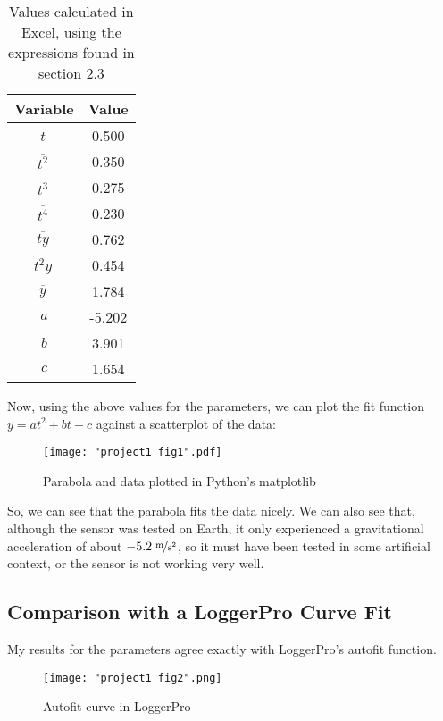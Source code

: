 \documentclass{article}
\newcommand{\ol}[1]{\overline{#1}\,} %
\begin{document}
\begin{table}[H]
	\centering
	\begin{tabular}{cc}
		\toprule
		\textbf{Variable} & \textbf{Value} \\
		\midrule
		$\ol{t}$ & 0.500\\
		$\ol{t^2}$ & 0.350\\
		$\ol{t^3}$ & 0.275\\
		$\ol{t^4}$ & 0.230\\
		$\ol{ty}$ & 0.762\\
		$\ol{t^2y}$ & 0.454\\
		$\ol{y}$ & 1.784\\
		\midrule
		$a$ & -5.202\\
		$b$ & 3.901\\
		$c$ & 1.654\\
		\bottomrule
	\end{tabular}
	\caption{Values calculated in Excel, using the expressions found in section 2.3}
\end{table}

Now, using the above values for the parameters, we can plot the fit function $y = at^2 + bt + c$ against a scatterplot of the data:

\begin{figure}[H]
\centering
\texttt{[image: "project1 fig1".pdf]}
\caption{Parabola and data plotted in Python's matplotlib}
\end{figure}

So, we can see that the parabola fits the data nicely. We can also see that, although the sensor was tested on Earth, it only experienced a gravitational acceleration of about $-5.2\; \nicefrac{\text{m}}{\text{s}^2}$, so it must have been tested in some artificial context, or the sensor is not working very well.

\subsection{Comparison with a LoggerPro Curve Fit}

My results for the parameters agree exactly with LoggerPro's autofit function.

\begin{figure}[H]
\centering
\texttt{[image: "project1 fig2".png]}
\caption{Autofit curve in LoggerPro}
\end{figure}
\end{document}
